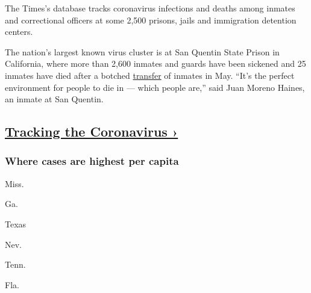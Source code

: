 The Times's database tracks coronavirus infections and deaths among
inmates and correctional officers at some 2,500 prisons, jails and
immigration detention centers.

The nation's largest known virus cluster is at San Quentin State Prison
in California, where more than 2,600 inmates and guards have been
sickened and 25 inmates have died after a botched
\href{https://www.nytimes3xbfgragh.onion/2020/06/30/us/san-quentin-prison-coronavirus.html}{transfer}
of inmates in May. ``It's the perfect environment for people to die in
--- which people are,'' said Juan Moreno Haines, an inmate at San
Quentin.

\hypertarget{tracking-the-coronavirus-}{%
\subsection{\texorpdfstring{\href{https://www.nytimes3xbfgragh.onion/interactive/2020/us/coronavirus-us-cases.html}{Tracking
the Coronavirus
›}}{Tracking the Coronavirus ›}}\label{tracking-the-coronavirus-}}

\href{https://www.nytimes3xbfgragh.onion/interactive/2020/us/coronavirus-us-cases.html}{}

\hypertarget{where-cases-are-highest-per-capita}{%
\subsubsection{\texorpdfstring{Where cases are \textbf{highest} per
capita}{Where cases are highest per capita}}\label{where-cases-are-highest-per-capita}}

\href{https://www.nytimes3xbfgragh.onion/interactive/2020/us/mississippi-coronavirus-cases.html}{}

Miss.
\href{https://www.nytimes3xbfgragh.onion/interactive/2020/us/georgia-coronavirus-cases.html}{}

Ga.
\href{https://www.nytimes3xbfgragh.onion/interactive/2020/us/texas-coronavirus-cases.html}{}

Texas
\href{https://www.nytimes3xbfgragh.onion/interactive/2020/us/nevada-coronavirus-cases.html}{}

Nev.
\href{https://www.nytimes3xbfgragh.onion/interactive/2020/us/tennessee-coronavirus-cases.html}{}

Tenn.
\href{https://www.nytimes3xbfgragh.onion/interactive/2020/us/florida-coronavirus-cases.html}{}

Fla.
\href{https://www.nytimes3xbfgragh.onion/interactive/2020/us/alabama-coronavirus-cases.html}{}

